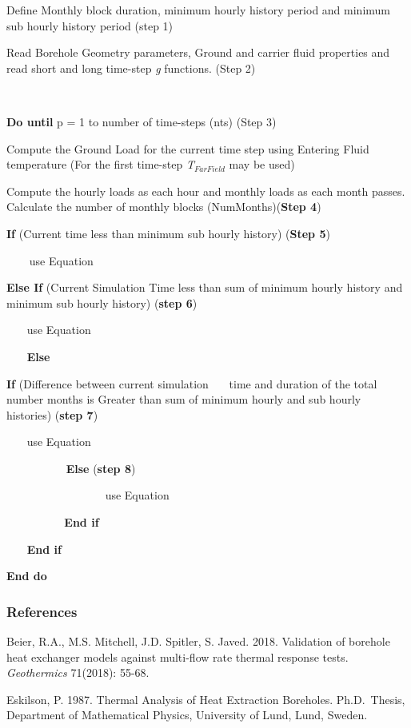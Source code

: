 Define Monthly block duration, minimum hourly history period and minimum sub hourly history period (step 1)

Read Borehole Geometry parameters, Ground and carrier fluid properties and read short and long time-step \emph{g} functions. (Step 2)

\textbf{~}

\textbf{Do until} p = 1 to number of time-steps (nts) (Step 3)

Compute the Ground Load for the current time step using Entering Fluid temperature (For the first time-step \emph{T}\(_{FarField}\) may be used)

Compute the hourly loads as each hour and monthly loads as each month passes. Calculate the number of monthly blocks (NumMonths)(\textbf{Step 4})

\textbf{If} (Current time less than minimum sub hourly history) (\textbf{Step 5})

\textbf{~~~} use Equation

\textbf{Else If} (Current Simulation Time less than sum of minimum hourly history and minimum sub hourly history) (\textbf{step 6})

~~~ use Equation

~~~ \textbf{Else}

\textbf{If} (Difference between current simulation~~~ time and duration of the total number months is Greater than sum of minimum hourly and sub hourly histories) (\textbf{step 7})

~~~ use Equation

~~~~~~~~~~ \textbf{Else} (\textbf{step 8})

~~~~~~~~~~~~~~~~~ use Equation

~~~ ~~~~~~ \textbf{End if}

~~~ \textbf{End if}

\textbf{End do}

\subsubsection{References}\label{references-2-006}

Beier, R.A., M.S. Mitchell, J.D. Spitler, S. Javed. 2018. Validation of borehole heat exchanger models against multi-flow rate thermal response tests. \textit{Geothermics} 71(2018): 55-68.

Eskilson, P. 1987. Thermal Analysis of Heat Extraction Boreholes. Ph.D.~Thesis, Department of Mathematical Physics, University of Lund, Lund, Sweden.

